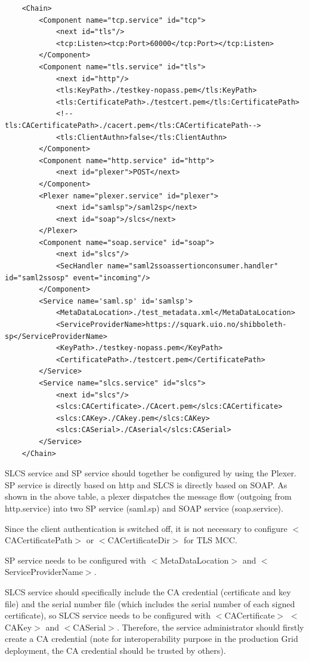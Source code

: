 \documentclass{article}                            %
\begin{document}
\begin{verbatim}
    <Chain>
        <Component name="tcp.service" id="tcp">
            <next id="tls"/>
            <tcp:Listen><tcp:Port>60000</tcp:Port></tcp:Listen>
        </Component>
        <Component name="tls.service" id="tls">
            <next id="http"/>
            <tls:KeyPath>./testkey-nopass.pem</tls:KeyPath>
            <tls:CertificatePath>./testcert.pem</tls:CertificatePath>
            <!--tls:CACertificatePath>./cacert.pem</tls:CACertificatePath-->
            <tls:ClientAuthn>false</tls:ClientAuthn>
        </Component>
        <Component name="http.service" id="http">
            <next id="plexer">POST</next>
        </Component>
        <Plexer name="plexer.service" id="plexer">
            <next id="samlsp">/saml2sp</next>
            <next id="soap">/slcs</next>
        </Plexer>
        <Component name="soap.service" id="soap">
            <next id="slcs"/>
            <SecHandler name="saml2ssoassertionconsumer.handler" id="saml2ssosp" event="incoming"/>
        </Component>
        <Service name='saml.sp' id='samlsp'>
            <MetaDataLocation>./test_metadata.xml</MetaDataLocation>
            <ServiceProviderName>https://squark.uio.no/shibboleth-sp</ServiceProviderName>
            <KeyPath>./testkey-nopass.pem</KeyPath>
            <CertificatePath>./testcert.pem</CertificatePath>
        </Service>
        <Service name="slcs.service" id="slcs">
            <next id="slcs"/>
            <slcs:CACertificate>./CAcert.pem</slcs:CACertificate>
            <slcs:CAKey>./CAkey.pem</slcs:CAKey>
            <slcs:CASerial>./CAserial</slcs:CASerial>
        </Service>
    </Chain>
\end{verbatim}

    SLCS service and SP service should together be configured by using the Plexer. SP service is directly based on http and SLCS is directly based on SOAP. As shown in the above table, a plexer dispatches the message flow (outgoing from http.service) into two SP service (saml.sp) and SOAP service (soap.service).

    Since the client authentication is switched off, it is not necessary to configure $<$CACertificatePath$>$ or $<$CACertificateDir$>$ for TLS MCC.

    SP service needs to be configured with $<$MetaDataLocation$>$ and $<$ServiceProviderName$>$.

    SLCS service should specifically include the CA credential (certificate and key file) and the serial number file (which includes the serial number of each signed certificate), so SLCS service needs to be configured with $<$CACertificate$>$ $<$CAKey$>$ and $<$CASerial$>$. Therefore, the service administrator should firstly create a CA credential (note for interoperability purpose in the production Grid deployment, the CA credential should be trusted by others).
\end{document}
